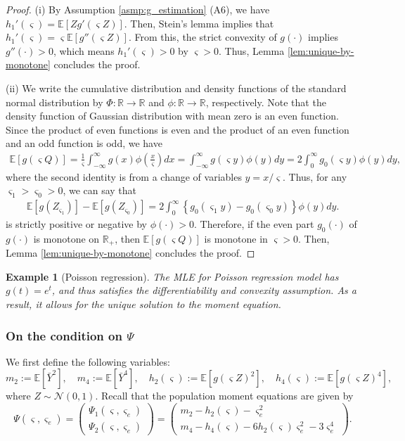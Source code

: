 \documentclass[12pt,reqno]{amsart}
\newtheorem{example}{Example}%
\newcommand{\rbr}[1]{\left(#1\right)}
\newcommand{\cbr}[1]{\left\{#1\right\}}
\newcommand{\R}{\mathbb{R}}
\newcommand{\E}{\mathbb{E}}
\newcommand{\bc}{\color{black}}
\newcommand{\cc}{\color{black}}
\begin{document}
{\begin{proof}
(i) By Assumption \ref{asmp:g_estimation} (A6), we have $h_1'(\varsigma)=\E[Zg'(\varsigma Z)]$. Then, Stein's lemma implies that $h_1'(\varsigma)=\varsigma\E[g''(\varsigma Z)]$.
From this, the strict convexity of $g(\cdot)$ implies $g''(\cdot)>0$, which means $h_1'(\varsigma)>0$ by $\varsigma>0$.
Thus, Lemma \ref{lem:unique-by-monotone} concludes the proof.

{\bc(ii) We write the cumulative distribution and density functions of the standard normal distribution by $\Phi:\R\to\R$ and $\phi:\R\to\R$, respectively.
Note that the density function of Gaussian distribution with mean zero is an even function. Since the product of even functions is even and the product of an even function and an odd function is odd, we have
\begin{align*}
    \E[g(\varsigma Q)]
    =\frac{1}{\varsigma}\int_{-\infty}^\infty g(x)\phi\rbr{\frac{x}{\varsigma}}dx
    =\int_{-\infty}^\infty g(\varsigma y)\phi\rbr{y}dy
    =2\int_{0}^\infty g_0(\varsigma y)\phi\rbr{y}dy,
\end{align*}
where the second identity is from a change of variables $y=x/\varsigma$. Thus, {\cc for} any $\varsigma_1>\varsigma_0>0$, we can say that
\begin{align*}
    \E[g(Z_{\varsigma_1})]-\E[g(Z_{\varsigma_0})]
    =2\int_{0}^\infty \cbr{g_0(\varsigma_1 y)-g_0(\varsigma_0 y)}\phi\rbr{y}dy.
\end{align*}
is strictly positive or negative by $\phi(\cdot)>0$. Therefore, if the even part $g_0(\cdot)$ of $g(\cdot)$ is monotone on $\R_+$, then $\E[g(\varsigma Q)]$ is monotone in $\varsigma>0$. 
Then, Lemma \ref{lem:unique-by-monotone} concludes the proof.}
\end{proof}

{\cc
\begin{example}[Poisson regression]
    The MLE for Poisson regression model has $g(t)=e^t$, and thus satisfies the differentiability and convexity assumption.
    As a result, it allows for the unique solution to the moment equation.
\end{example}
}

\subsubsection{On the condition on $\Psi$}

We first define the following variables:
\[
m_2 := \E[\bar Y^2], \quad
m_4 := \E[\bar Y^4], \quad
h_2(\varsigma) := \E[g(\varsigma Z)^2], \quad
h_4(\varsigma) := \E[g(\varsigma Z)^4],
\]
where $Z\sim\mathcal N(0,1)$.
Recall that the population moment equations are given by
\[
\Psi(\varsigma,\varsigma_e)
=
\begin{pmatrix}
\Psi_1(\varsigma,\varsigma_e)\\
\Psi_2(\varsigma,\varsigma_e)
\end{pmatrix}
=
\begin{pmatrix}
m_2-h_2(\varsigma)-\varsigma_e^2\\
m_4-h_4(\varsigma)-6h_2(\varsigma)\varsigma_e^2-3\varsigma_e^4
\end{pmatrix}.
\]

}
\end{document}
